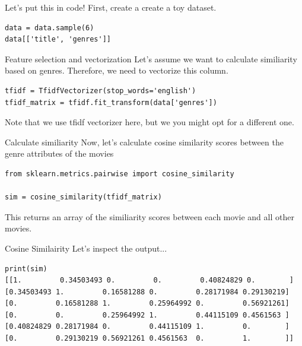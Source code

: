 \documentclass[compress]{beamer}
\begin{document}
\begin{frame}[fragile]{Let's put this in code!}
\pause
First, create a create a toy dataset.
\pause
\begin{verbatim}
data = data.sample(6)
data[['title', 'genres']]
\end{verbatim}
\pause
\end{frame}


\begin{frame}[fragile]{Feature selection and vectorization}
Let's assume we want to calculate similiarity based on genres. Therefore, we need to vectorize this column. 
	\begin{verbatim}
tfidf = TfidfVectorizer(stop_words='english')
tfidf_matrix = tfidf.fit_transform(data['genres'])
	\end{verbatim}
\pause
Note that we use \alert{tfidf vectorizer} here, but we you might opt for a different one. 
\end{frame}



\begin{frame}[fragile]{Calculate similiarity}
Now, let's calculate cosine similarity scores between the genre attributes of the movies
	\begin{verbatim}
from sklearn.metrics.pairwise import cosine_similarity

sim = cosine_similarity(tfidf_matrix)
	\end{verbatim}
	\pause
This returns an array of the similiarity scores between each movie and all other movies. 
\end{frame}

\begin{frame}[fragile]{Cosine Similairity}
Let's inspect the output...
	\begin{verbatim}
print(sim)
[[1.         0.34503493 0.         0.         0.40824829 0.        ]
[0.34503493 1.         0.16581288 0.         0.28171984 0.29130219]
[0.         0.16581288 1.         0.25964992 0.         0.56921261]
[0.         0.         0.25964992 1.         0.44115109 0.4561563 ]
[0.40824829 0.28171984 0.         0.44115109 1.         0.        ]
[0.         0.29130219 0.56921261 0.4561563  0.         1.        ]]
	\end{verbatim}
\end{frame}
\end{document}
